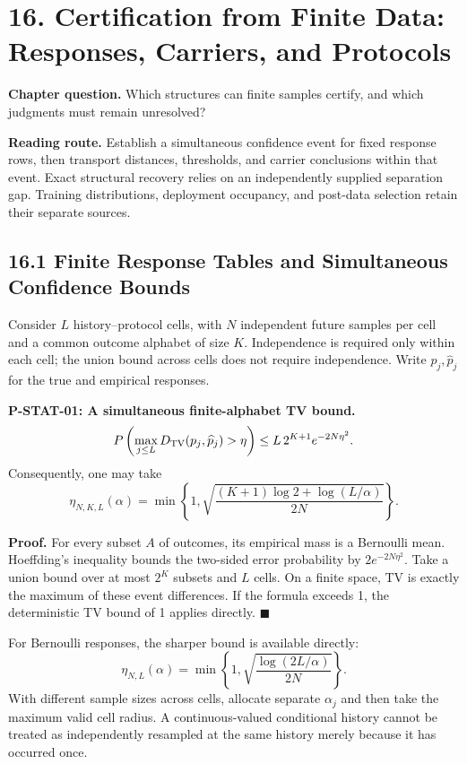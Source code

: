 \documentclass[
  english,
  11pt,
  oneside]{book}
\begin{document}
\chapter{16. Certification from Finite Data: Responses, Carriers, and Protocols}\label{ch-16}

\textbf{Chapter question.} Which structures can finite samples certify, and which judgments must remain unresolved?

\textbf{Reading route.} Establish a simultaneous confidence event for fixed response rows, then transport distances, thresholds, and carrier conclusions within that event. Exact structural recovery relies on an independently supplied separation gap. Training distributions, deployment occupancy, and post-data selection retain their separate sources.

\section{16.1 Finite Response Tables and Simultaneous Confidence Bounds}\label{finite-response-tables-and-simultaneous-confidence-bounds}

Consider \(L\) history--protocol cells, with \(N\) independent future samples per cell and a common outcome alphabet of size \(K\). Independence is required only within each cell; the union bound across cells does not require independence. Write \(p_j,\widehat p_j\) for the true and empirical responses.

\hypertarget{p-stat-01}{}\label{p-stat-01}

\textbf{P-STAT-01: A simultaneous finite-alphabet TV bound.} \[P\left(\max_{j\le L}D_{\rm TV}(p_j,\widehat p_j)>\eta\right)
\le L\,2^{K+1}e^{-2N\eta^2}.\] Consequently, one may take \[\eta_{N,K,L}(\alpha)=
\min\left\{1,\sqrt{\frac{(K+1)\log2+\log(L/\alpha)}{2N}}\right\}.\]

\textbf{Proof.} For every subset \(A\) of outcomes, its empirical mass is a Bernoulli mean. Hoeffding's inequality bounds the two-sided error probability by \(2e^{-2N\eta^2}\). Take a union bound over at most \(2^K\) subsets and \(L\) cells. On a finite space, TV is exactly the maximum of these event differences. If the formula exceeds 1, the deterministic TV bound of 1 applies directly. \(\blacksquare\)

For Bernoulli responses, the sharper bound is available directly: \[\eta_{N,L}(\alpha)=
\min\left\{1,\sqrt{\frac{\log(2L/\alpha)}{2N}}\right\}.\] With different sample sizes across cells, allocate separate \(\alpha_j\) and then take the maximum valid cell radius. A continuous-valued conditional history cannot be treated as independently resampled at the same history merely because it has occurred once.
\end{document}
